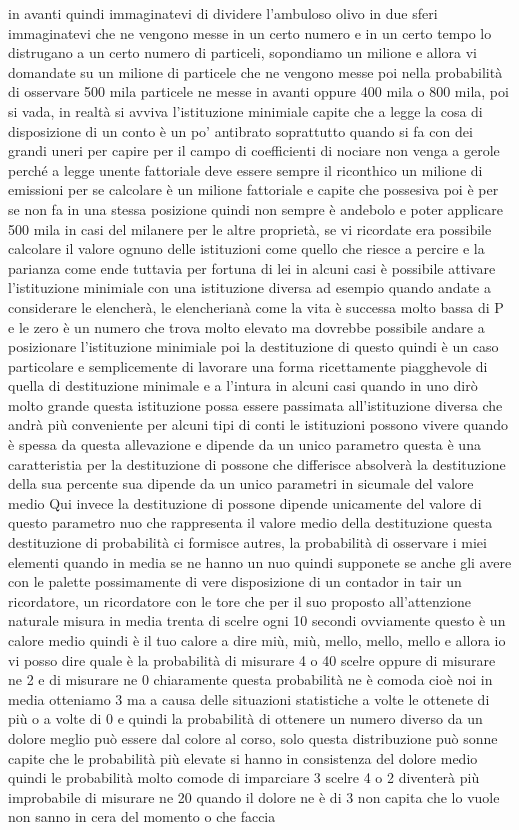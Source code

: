 {in avanti quindi immaginatevi di dividere l'ambuloso olivo in due sferi immaginatevi che ne vengono messe in un certo numero e in un certo tempo lo distrugano a un certo numero di particeli, sopondiamo un milione e allora vi domandate su un milione di particele che ne vengono messe poi nella probabilità di osservare 500 mila particele ne messe in avanti oppure 400 mila o 800 mila, poi si vada, in realtà si avviva l'istituzione minimiale capite che a legge la cosa di disposizione di un conto è un po' antibrato soprattutto quando si fa con dei grandi uneri per capire per il campo di coefficienti di nociare non venga a gerole perché a legge unente fattoriale deve essere sempre il riconthico un milione di emissioni per se calcolare è un milione fattoriale e capite che possesiva poi è per se non fa in una stessa posizione quindi non sempre è andebolo e poter applicare 500 mila in casi del milanere per le altre proprietà, se vi ricordate era possibile calcolare il valore ognuno delle istituzioni come quello che riesce a percire e la parianza come ende tuttavia per fortuna di lei in alcuni casi è possibile attivare l'istituzione minimiale con una istituzione diversa ad esempio quando andate a considerare le elencherà, le elencherianà come la vita è successa molto bassa di P e le zero è un numero che trova molto elevato ma dovrebbe possibile andare a posizionare l'istituzione minimiale poi la destituzione di questo quindi è un caso particolare e semplicemente di lavorare una forma ricettamente piagghevole di quella di destituzione minimale e a l'intura in alcuni casi quando in uno dirò molto grande questa istituzione possa essere passimata all'istituzione diversa che andrà più conveniente per alcuni tipi di conti le istituzioni possono vivere quando è spessa da questa allevazione e dipende da un unico parametro questa è una caratteristia per la destituzione di possone che differisce absolverà la destituzione della sua percente sua dipende da un unico parametri in sicumale del valore medio Qui invece la destituzione di possone dipende unicamente del valore di questo parametro nuo che rappresenta il valore medio della destituzione questa destituzione di probabilità ci formisce autres, la probabilità di osservare i miei elementi quando in media se ne hanno un nuo quindi supponete se anche gli avere con le palette possimamente di vere disposizione di un contador in tair un ricordatore, un ricordatore con le tore che per il suo proposto all'attenzione naturale misura in media trenta di scelre ogni 10 secondi ovviamente questo è un calore medio quindi è il tuo calore a dire miù, miù, mello, mello, mello e allora io vi posso dire quale è la probabilità di misurare 4 o 40 scelre oppure di misurare ne 2 e di misurare ne 0 chiaramente questa probabilità ne è comoda cioè noi in media otteniamo 3 ma a causa delle situazioni statistiche a volte le ottenete di più o a volte di 0 e quindi la probabilità di ottenere un numero diverso da un dolore meglio può essere dal colore al corso, solo questa distribuzione può sonne capite che le probabilità più elevate si hanno in consistenza del dolore medio quindi le probabilità molto comode di imparciare 3 scelre 4 o 2 diventerà più improbabile di misurare ne 20 quando il dolore ne è di 3 non capita che lo vuole non sanno in cera del momento o che faccia }
